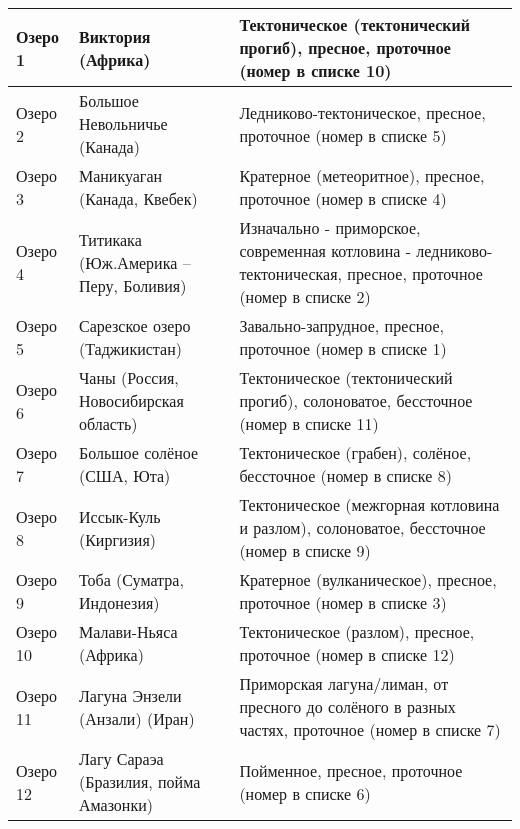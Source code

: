 \begin{longtable}{|l|l|l}
    \hline
    \rowcolor{blue} Озеро 1 & Виктория (Африка) & Тектоническое (тектонический прогиб), пресное, проточное (номер в списке 10) \\
    \hline
    \rowcolor{blue} Озеро 2 & Большое Невольничье (Канада) & Ледниково-тектоническое, пресное, проточное (номер в списке 5) \\
    \hline
    \rowcolor{green} Озеро 3 & Маникуаган (Канада, Квебек) & Кратерное (метеоритное), пресное, проточное (номер в списке 4) \\
    \hline
    \rowcolor{blue} Озеро 4 & Титикака (Юж.Америка – Перу, Боливия) & Изначально - приморское, современная котловина - ледниково-тектоническая, пресное, проточное (номер в списке 2) \\
    \hline
    \rowcolor{green} Озеро 5 & Сарезское озеро (Таджикистан) & Завально-запрудное, пресное, проточное (номер в списке 1) \\
    \hline
    \rowcolor{cyan} Озеро 6 & Чаны (Россия, Новосибирская область) & Тектоническое (тектонический прогиб), солоноватое, бессточное (номер в списке 11) \\
    \hline
    \rowcolor{green} Озеро 7 & Большое солёное (США, Юта) & Тектоническое (грабен), солёное, бессточное (номер в списке 8) \\
    \hline
    \rowcolor{yellow} Озеро 8 & Иссык-Куль (Киргизия) & Тектоническое (межгорная котловина и разлом), солоноватое, бессточное (номер в списке 9) \\
    \hline
    \rowcolor{yellow} Озеро 9 & Тоба (Суматра, Индонезия) & Кратерное (вулканическое), пресное, проточное (номер в списке 3) \\
    \hline
    \rowcolor{greem} Озеро 10 & Малави-Ньяса (Африка) & Тектоническое (разлом), пресное, проточное (номер в списке 12) \\
    \hline
    \rowcolor{green} Озеро 11 & Лагуна Энзели (Анзали) (Иран)	& Приморская лагуна/лиман, от пресного до солёного в разных частях, проточное (номер в списке 7) \\
    \hline
    \rowcolor{green} Озеро 12 & Лагу Сараэа (Бразилия, пойма Амазонки) & Пойменное, пресное, проточное (номер в списке 6) \\
    \hline
\end{longtable}